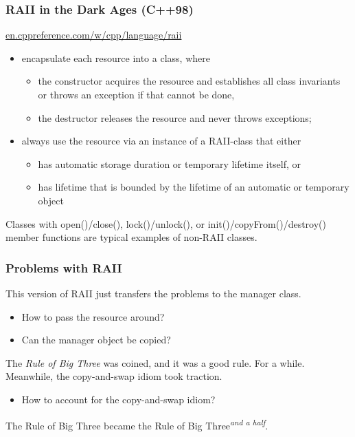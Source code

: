 \documentclass[aspectratio=169]{beamer}
\newcommand{\greenemph}[1]{\textit{\textcolor{clGreen}{#1}}}
\begin{document}
\begin{frame}
\frametitle{RAII in the Dark Ages (C++98)}
\href{https://en.cppreference.com/w/cpp/language/raii}{en.cppreference.com/w/cpp/language/raii}
\begin{itemize}
  \item{encapsulate each resource into a class, where}
  \begin{itemize}
    \item{the constructor acquires the resource and establishes all class invariants or throws an exception if that cannot be done,}
    \item{the destructor releases the resource and never throws exceptions;}
  \end{itemize}
  \item{always use the resource via an instance of a RAII-class that either}
  \begin{itemize}
    \item{has automatic storage duration or temporary lifetime itself, or}
    \item{has lifetime that is bounded by the lifetime of an automatic or temporary object}
  \end{itemize}
\end{itemize}
Classes with open()/close(), lock()/unlock(), or init()/copyFrom()/destroy() member functions are typical examples of non-RAII classes.
\end{frame}

\begin{frame}
\frametitle{Problems with RAII}
This version of RAII just transfers the problems to the manager class.
\begin{itemize}
  \item{How to pass the resource around?}
  \item{Can the manager object be copied?}
\end{itemize}
The \greenemph{Rule of Big Three} was coined, and it was a good rule. For a while.\\
\vspace{0.5cm}
Meanwhile, the copy-and-swap idiom took traction.
\begin{itemize}
  \item{How to account for the copy-and-swap idiom?}
\end{itemize}
The Rule of Big Three became the Rule of Big Three\textsuperscript{\greenemph{and a half}}.
\end{frame}
\end{document}
